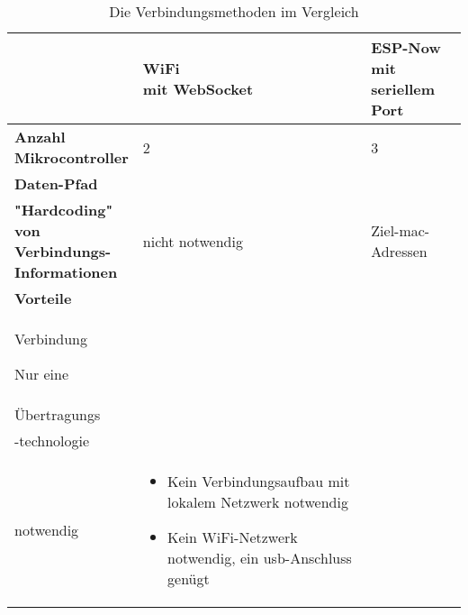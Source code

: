\begin{table}[t]
    \centering
    \begin{threeparttable}
        \caption{Die Verbindungsmethoden im Vergleich}
        \begin{tabular}{|m{2.8cm}|m{3cm}|m{4cm}|}
            \hline
            ~                                                     & \parbox[c][1cm]{3cm}{\textbf{WiFi \\mit WebSocket}} & \parbox[c][1cm]{4cm}{\textbf{ESP-Now\\mit seriellem Port}} \\ \hline
            \parbox[c][1cm]{2.8cm}{\textbf{Anzahl                                                     \\Mikrocontroller}} & 2                                                     & 3 \\ \hline
            \parbox[c][3cm]{2.8cm}{\textbf{Daten-Pfad}}           & \parbox[c]{3cm}{}                            & \parbox[c]{3cm}{}   \\ \hline
            \parbox[c][2cm]{2.8cm}{\textbf{"Hardcoding"                                               \\von\\Verbindungs-\\Informationen}} & nicht notwendig & Ziel-\ac{mac}-Adressen \\ \hline
            \parbox[c][3.5cm]{2.8cm}{\textbf{Vorteile}}
                                                                  &
            \parbox[c][3cm]{4cm}{
            \begin{itemize}
                    \item Stabilere\\Verbindung
                    \item Nur eine\\Übertragungs\\-technologie\\notwendig
                \end{itemize}} &
            \parbox[c][3.5cm]{4cm}{
            \begin{itemize}
                    \item Kein Verbindungsaufbau mit lokalem Netzwerk notwendig
                    \item Kein WiFi-Netzwerk notwendig, ein \ac{usb}-Anschluss genügt
                \end{itemize}}                          \\ \hline
        \end{tabular}
    \end{threeparttable}
\end{table}